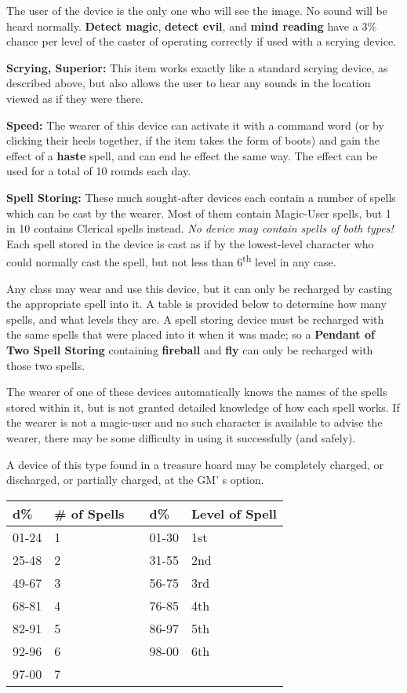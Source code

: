 \documentclass[a4paper,twoside,openany,10pt]{book}
\begin{document}
\begin{multicols}{2}
The user of the device is the only one who will see the image. No sound will be heard normally. \textbf{Detect magic}, \textbf{detect evil}, and \textbf{mind reading} have a 3\% chance per level of the caster of operating correctly if used with a scrying device.

\textbf{Scrying, Superior:} This item works exactly like a standard scrying device, as described above, but also allows the user to hear any sounds in the location viewed as if they were there.

\textbf{Speed:} The wearer of this device can activate it with a command word (or by clicking their heels together, if the item takes the form of boots) and gain the effect of a \textbf{haste}\emph{ }spell, and can end he effect the same way. The effect can be used for a total of 10 rounds each day.

\textbf{Spell Storing:} These much sought-after devices each contain a number of spells which can be cast by the wearer. Most of them contain Magic-User spells, but 1 in 10 contains Clerical spells instead. \emph{No device may contain spells of both types! } Each spell stored in the device is cast as if by the lowest-level character who could normally cast the spell, but not less than 6\textsuperscript{th} level in any case.

Any class may wear and use this device, but it can only be recharged by casting the appropriate spell into it. A table is provided below to determine how many spells, and what levels they are. A spell storing device must be recharged with the same spells that were placed into it when it was made; so a \textbf{Pendant of Two Spell Storing} containing \textbf{fireball} and \textbf{fly }can only be recharged with those two spells.

The wearer of one of these devices automatically knows the names of the spells stored within it, but is not granted detailed knowledge of how each spell works. If the wearer is not a magic-user and no such character is available to advise the wearer, there may be some difficulty in using it successfully (and safely).

A device of this type found in a treasure hoard may be completely charged, or discharged, or partially charged, at the GM' s option.\medskip

\begin{tabular*}{0.93\linewidth}{@{\extracolsep{\fill}}lllll}
d\% & \# of Spells & & d\% & Level of Spell \\\toprule
01-24 & 1 & & 01-30 & 1st \\\hline
25-48 & 2 & & 31-55 & 2nd \\\hline
49-67 & 3 & & 56-75 & 3rd \\\hline
68-81 & 4 & & 76-85 & 4th \\\hline
82-91 & 5 & & 86-97 & 5th \\\hline
92-96 & 6 & & 98-00 & 6th \\\bottomrule
97-00 & 7 & & & \\\hline
\end{tabular*}\medskip


\end{multicols}
\end{document}
